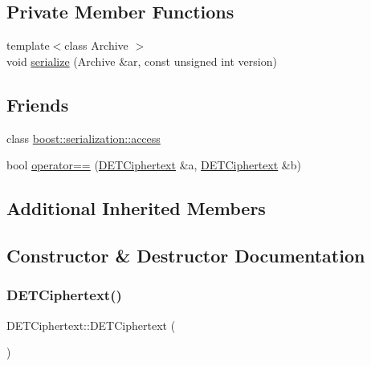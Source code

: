 \subsection*{Private Member Functions}
\begin{DoxyCompactItemize}
\item 
{\footnotesize template$<$class Archive $>$ }\\void \hyperlink{classDETCiphertext_a1c1a7050c492627da2b277d9064635e6}{serialize} (Archive \&ar, const unsigned int version)
\end{DoxyCompactItemize}
\subsection*{Friends}
\begin{DoxyCompactItemize}
\item 
class \hyperlink{classDETCiphertext_ac98d07dd8f7b70e16ccb9a01abf56b9c}{boost\+::serialization\+::access}
\item 
bool \hyperlink{classDETCiphertext_a5f7e97804478b1b2badc92d540797b73}{operator==} (\hyperlink{classDETCiphertext}{D\+E\+T\+Ciphertext} \&a, \hyperlink{classDETCiphertext}{D\+E\+T\+Ciphertext} \&b)
\end{DoxyCompactItemize}
\subsection*{Additional Inherited Members}


\subsection{Constructor \& Destructor Documentation}
\mbox{\label{classDETCiphertext_abf102b1ca2a4dc34ee71e4ed92df3977}} 
\subsubsection{\texorpdfstring{D\+E\+T\+Ciphertext()}{DETCiphertext()}\hspace{0.1cm}{\footnotesize\ttfamily [1/2]}}
{\footnotesize\ttfamily D\+E\+T\+Ciphertext\+::\+D\+E\+T\+Ciphertext (\begin{DoxyParamCaption}{ }\end{DoxyParamCaption})}

